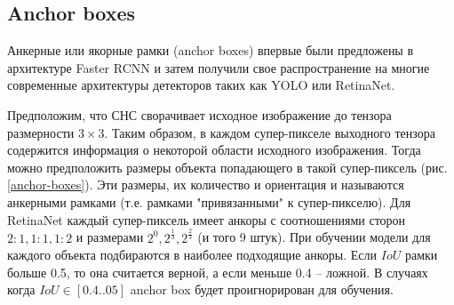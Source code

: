 \subsection{Anchor boxes}

Анкерные или якорные рамки (anchor boxes) впервые были предложены в архитектуре Faster RCNN и затем получили свое распространение на многие современные архитектуры детекторов таких как YOLO или RetinaNet. 

Предположим, что СНС сворачивает исходное изображение до тензора размерности $3 \times 3$. Таким образом, в каждом супер-пикселе выходного тензора содержится информация о некоторой области исходного изображения. Тогда можно предположить размеры объекта попадающего в такой супер-пиксель (рис. \ref{anchor-boxes}). Эти размеры, их количество и ориентация и называются анкерными рамками (т.е. рамками "привязанными" к супер-пикселю). Для RetinaNet каждый супер-пиксель имеет анкоры с соотношениями сторон $2:1, 1:1, 1:2$ и размерами $2^0, 2^{\frac{1}{3}}, 2^{\frac{2}{3}}$ (и того 9 штук). При обучении модели для каждого объекта подбираются в наиболее подходящие анкоры. Если $IoU$ рамки больше 0.5, то она считается верной, а если меньше 0.4 -- ложной. В случаях когда $IoU \in [0.4 .. 05]$ anchor box будет проигнорирован для обучения.

